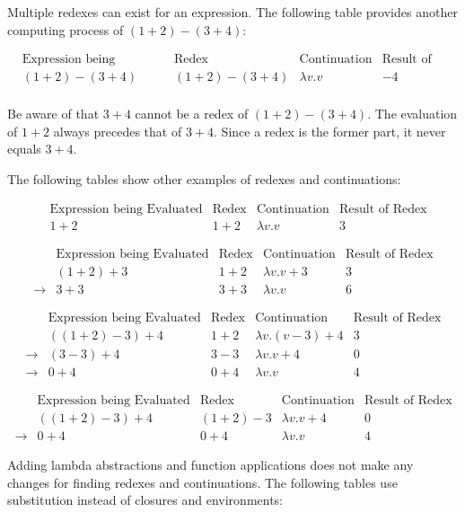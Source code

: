 Multiple redexes can exist for an expression. The following table provides
another computing process of $(1+2)-(3+4)$:


\[
\begin{array}{ccccc}
&\text{Expression being Evaluated} & \text{Redex} & \text{Continuation} &
\text{Result of Redex} \\
& (1+2)-(3+4) & (1+2)-(3+4) & \lambda v.v & -4 \\
\end{array}
\]

Be aware of that $3+4$ cannot be a redex of $(1+2)-(3+4)$. The evaluation of
$1+2$ always precedes that of $3+4$. Since a redex is the former part, it never
equals $3+4$.

The following tables show other examples of redexes and continuations:

\[
\begin{array}{ccccc}
&\text{Expression being Evaluated} & \text{Redex} & \text{Continuation} &
\text{Result of Redex} \\
& 1+2 & 1+2 & \lambda v.v & 3
\end{array}
\]

\[
\begin{array}{ccccc}
&\text{Expression being Evaluated} & \text{Redex} & \text{Continuation} &
\text{Result of Redex} \\
& (1+2)+3 & 1+2 & \lambda v.v+3 & 3 \\
\rightarrow&3+3 & 3+3 & \lambda v.v & 6
\end{array}
\]

\[
\begin{array}{ccccc}
&\text{Expression being Evaluated} & \text{Redex} & \text{Continuation} &
\text{Result of Redex} \\
& ((1+2)-3)+4 & 1+2 & \lambda v.(v-3)+4 & 3 \\
\rightarrow&(3-3)+4 & 3-3 & \lambda v.v+4 & 0 \\
\rightarrow&0+4 & 0+4 & \lambda v.v & 4
\end{array}
\]

\[
\begin{array}{ccccc}
&\text{Expression being Evaluated} & \text{Redex} & \text{Continuation} &
\text{Result of Redex} \\
& ((1+2)-3)+4 & (1+2)-3 &\lambda v.v+4 & 0 \\
\rightarrow&0+4 & 0+4 & \lambda v.v & 4
\end{array}
\]

Adding lambda abstractions and function applications does not make any changes
for finding redexes and continuations. The following tables use substitution
instead of closures and environments:

